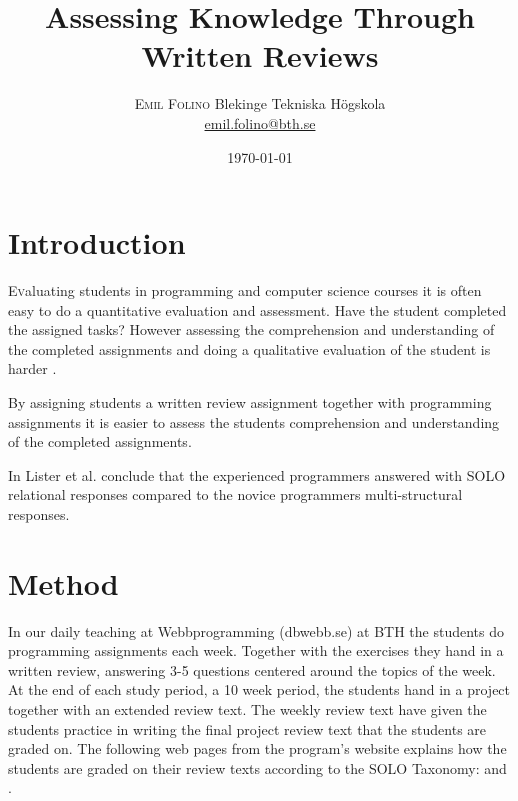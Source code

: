 \documentclass[twoside,twocolumn,a4paper,11pt,english]{article}
\title{Assessing Knowledge Through Written Reviews} %
\author{%
\textsc{Emil Folino} %
\normalsize Blekinge Tekniska Högskola \\ %
\normalsize \href{mailto:emil.folino@bth.se}{emil.folino@bth.se} %
}
\date{\today} %
\begin{document}
\maketitle


\section{Introduction}

\lettrine[nindent=0em,lines=3]{E} valuating students in programming and computer science courses it is often easy to do a quantitative evaluation and assessment. Have the student completed the assigned tasks? However assessing the comprehension and understanding of the completed assignments and doing a qualitative evaluation of the student is harder \cite{biggs1982evaluation}.

By assigning students a written review assignment together with programming assignments it is easier to assess the students comprehension and understanding of the completed assignments\cite{lister2006not}.

In \cite{lister2006not} Lister et al. conclude that the experienced programmers answered with SOLO relational responses compared to the novice programmers multi-structural responses.



\section{Method}

In our daily teaching at Webbprogramming (dbwebb.se) at BTH the students do programming assignments each week. Together with the exercises they hand in a written review, answering 3-5 questions centered around the topics of the week. At the end of each study period, a 10 week period, the students hand in a project together with an extended review text. The weekly review text have given the students practice in writing the final project review text that the students are graded on. The following web pages from the program's website explains how the students are graded on their review texts according to the SOLO Taxonomy: \cite{redovisning} and \cite{solo}.
\end{document}
